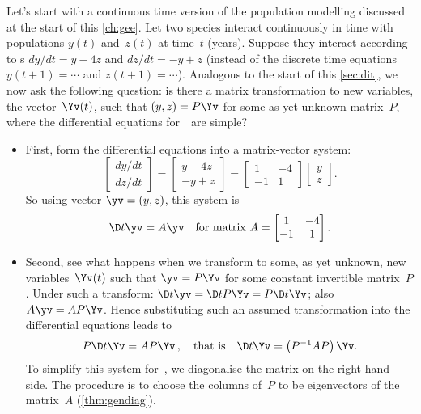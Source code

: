 Let's start with a continuous time version of the population modelling discussed at the start of this \autoref{ch:gee}.
Let two species interact continuously in time with populations \(y(t)\) and~\(z(t)\) at time~\(t\) (years).
Suppose they interact according to s \(dy/dt=y-4z\) and \(dz/dt=-y+z\) (instead of the discrete time equations \(y(t+1)=\cdots\) and \(z(t+1)=\cdots\)).
Analogous to the start of this \autoref{sec:dit}, we now ask the following question: is there a matrix transformation to new variables, the vector~\(\Yv(t)\), such that \((y,z)=P\Yv\) for some as yet unknown matrix~\(P\), where the differential equations for~\Yv\ are simple?
\begin{itemize}
\item First, form the differential equations into a matrix-vector system:
\begin{equation*}
\begin{bmatrix} dy/dt\\dz/dt \end{bmatrix}
=\begin{bmatrix} y-4z
\\ -y+z \end{bmatrix}
=\begin{bmatrix} 1&-4\\-1& 1 \end{bmatrix}\begin{bmatrix} y\\z \end{bmatrix}.
\end{equation*}
So using vector \(\yv=(y,z)\), this system is
\begin{equation*}
\D t\yv=A\yv
\quad\text{for matrix }A=\begin{bmatrix} 1&-4\\-1& 1 \end{bmatrix}.
\end{equation*}

\item Second, see what happens when we transform to some, as yet unknown, new variables~\(\Yv(t)\) such that \(\yv=P\Yv\) for some constant invertible matrix~\(P\).
Under such a transform: \(\D t\yv=\D t{}P\Yv=P\D t\Yv\); also \(A\yv=AP\Yv\).
Hence substituting such an assumed transformation into the differential equations leads to
\begin{equation*}
P\D t\Yv=AP\Yv\,, 
\quad\text{that is}\quad
\D t\Yv=\left(P^{-1}AP\right)\Yv.
\end{equation*}
To simplify this system for~\Yv, we diagonalise the matrix on the right-hand side.
The procedure is to choose the columns of~\(P\) to be eigenvectors of the matrix~\(A\) (\autoref{thm:gendiag}).


\end{itemize}
